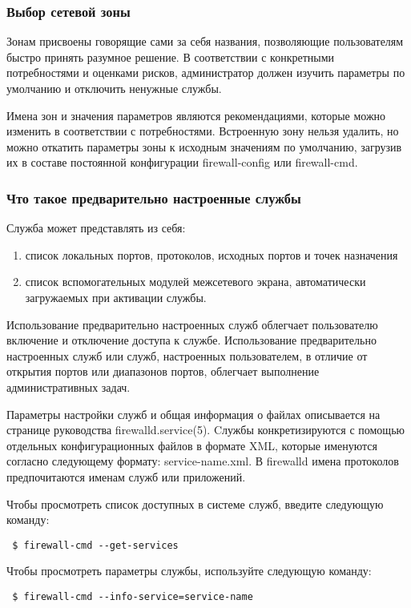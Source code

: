 \documentclass[a4paper,10pt,twoside]{article}
\begin{document}
\subsubsection{Выбор сетевой зоны}
Зонам присвоены говорящие сами за себя названия, позволяющие пользователям быстро принять разумное решение. В соответствии с конкретными потребностями и оценками рисков, администратор должен изучить параметры по умолчанию и отключить ненужные службы.

Имена зон и значения параметров являются рекомендациями, которые можно изменить в соответствии с потребностями.  Встроенную зону нельзя удалить, но можно откатить параметры зоны к исходным значениям по умолчанию, загрузив их в составе постоянной конфигурации firewall-config или firewall-cmd.


\subsubsection{Что такое предварительно настроенные службы}

Служба может представлять из себя: 

\begin{enumerate}
 \item список локальных портов, протоколов, исходных портов и точек назначения
 \item список вспомогательных модулей межсетевого экрана, автоматически загружаемых при активации службы. 
\end{enumerate}


Использование предварительно настроенных служб облегчает пользователю включение и отключение доступа к службе. Использование предварительно настроенных служб или служб, настроенных пользователем, в отличие от открытия портов или диапазонов портов, облегчает выполнение административных задач. 

Параметры настройки служб и общая информация о файлах описывается на странице руководства firewalld.service(5). Cлужбы конкретизируются с помощью отдельных конфигурационных файлов  в формате XML, которые именуются согласно следующему формату: service-name.xml. В firewalld имена протоколов предпочитаются именам служб или приложений.


Чтобы просмотреть список доступных в системе служб, введите следующую команду:
\begin{verbatim}
 $ firewall-cmd --get-services
\end{verbatim} 

Чтобы просмотреть параметры службы, используйте следующую команду:
\begin{verbatim}
 $ firewall-cmd --info-service=service-name
\end{verbatim} 
\end{document}
